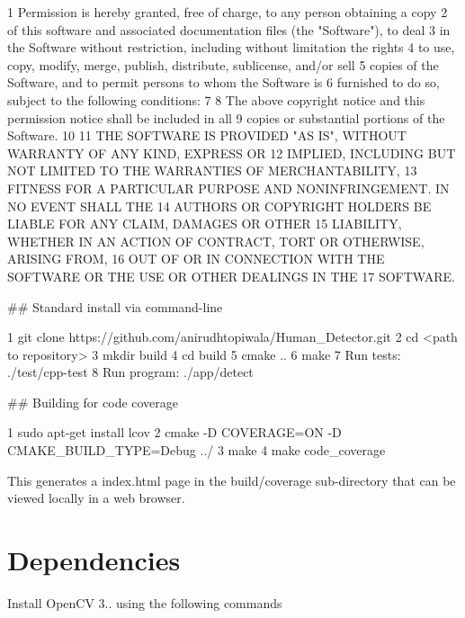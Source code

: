 \begin{DoxyCode}
1 Permission is hereby granted, free of charge, to any person obtaining a copy
2 of this software and associated documentation files (the "Software"), to deal
3 in the Software without restriction, including without limitation the rights
4 to use, copy, modify, merge, publish, distribute, sublicense, and/or sell
5 copies of the Software, and to permit persons to whom the Software is
6 furnished to do so, subject to the following conditions:
7 
8 The above copyright notice and this permission notice shall be included in all
9 copies or substantial portions of the Software.
10 
11 THE SOFTWARE IS PROVIDED "AS IS", WITHOUT WARRANTY OF ANY KIND, EXPRESS OR
12 IMPLIED, INCLUDING BUT NOT LIMITED TO THE WARRANTIES OF MERCHANTABILITY,
13 FITNESS FOR A PARTICULAR PURPOSE AND NONINFRINGEMENT. IN NO EVENT SHALL THE
14 AUTHORS OR COPYRIGHT HOLDERS BE LIABLE FOR ANY CLAIM, DAMAGES OR OTHER
15 LIABILITY, WHETHER IN AN ACTION OF CONTRACT, TORT OR OTHERWISE, ARISING FROM,
16 OUT OF OR IN CONNECTION WITH THE SOFTWARE OR THE USE OR OTHER DEALINGS IN THE
17 SOFTWARE.
\end{DoxyCode}


\#\# Standard install via command-\/line 
\begin{DoxyCode}
1 git clone https://github.com/anirudhtopiwala/Human\_Detector.git
2 cd <path to repository>
3 mkdir build
4 cd build
5 cmake ..
6 make
7 Run tests: ./test/cpp-test
8 Run program: ./app/detect
\end{DoxyCode}


\#\# Building for code coverage 
\begin{DoxyCode}
1 sudo apt-get install lcov
2 cmake -D COVERAGE=ON -D CMAKE\_BUILD\_TYPE=Debug ../
3 make
4 make code\_coverage
\end{DoxyCode}
 This generates a index.\+html page in the build/coverage sub-\/directory that can be viewed locally in a web browser.

\section*{Dependencies}

Install Open\+CV 3.. using the following commands


